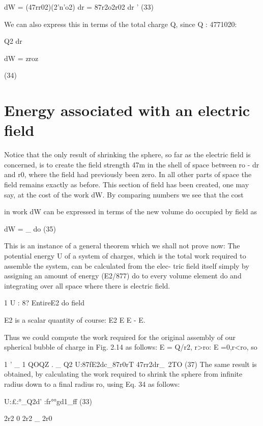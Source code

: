 dW = (47rr02)(2'n'o2) dr = 87r2o2r02 dr ' (33)

We can also express this in terms of the total charge Q, since
Q : 4771020:

Q2 dr

dW = zroz

(34)

\section{Energy associated with an electric field}

Notice that the only result of shrinking the sphere, so far as the
electric field is concerned, is to create the field strength 47m in the
shell of space between ro - dr and r0, where the field had previously
been zero. In all other parts of space the field remains exactly as
before. This section of field has been created, one may say, at the
cost of the work dW. By comparing numbers we see that the cost

in work dW can be expressed in terms of the new volume do occupied
by field as

dW = _ do (35)

This is an instance of a general theorem which we shall not prove
now: The potential energy U of a system of charges, which is the total
work required to assemble the system, can be calculated from the elec-
tric field itself simply by assigning an amount of energy (E2/877) do to
every volume element do and integrating over all space where there
is electric field.

1
U : 8? EntireE2 do 
field

E2 is a scalar quantity of course: E2 E E - E.

Thus we could compute the work required for the original assembly
of our spherical bubble of charge in Fig. 2.14 as follows: E = Q/r2,
r>ro: E =0,r<ro, so

1 ' _ 1 QOQZ . _ Q2
U:87fE2dc_87r0rT 47rr2dr_~2TO (37)
The same result is obtained, by calculating the work required to
shrink the sphere from infinite radius down to a final radius ro, using
Eq. 34 as follows:

U:£:°_Q2d' :fr°°gd1_ff (33)

2r2 0 2r2 _ 2r0

 

